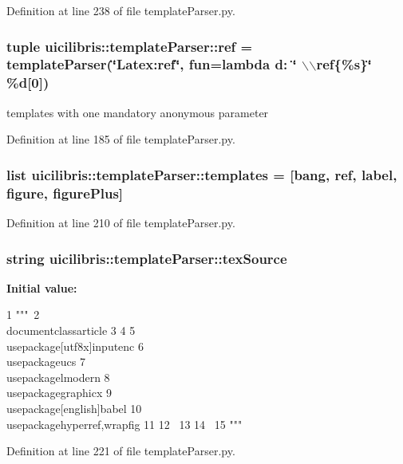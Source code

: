 \-Definition at line 238 of file template\-Parser.\-py.

\hypertarget{namespaceuicilibris_1_1templateParser_ad641a7d51cf16935ac4a7912f8cca790}{
\subsubsection[{ref}]{\setlength{\rightskip}{0pt plus 5cm}tuple {\bf uicilibris\-::template\-Parser\-::ref} = {\bf template\-Parser}(\char`\"{}\-Latex\-:ref\char`\"{}, fun=lambda d\-: \char`\"{} $\backslash$$\backslash$ref\{\%s\}\char`\"{} \%d\mbox{[}0\mbox{]})}}\label{namespaceuicilibris_1_1templateParser_ad641a7d51cf16935ac4a7912f8cca790}


templates with one mandatory anonymous parameter 



\-Definition at line 185 of file template\-Parser.\-py.

\hypertarget{namespaceuicilibris_1_1templateParser_ad7d8a741383be26743e20995ca1fefb5}{
\subsubsection[{templates}]{\setlength{\rightskip}{0pt plus 5cm}list {\bf uicilibris\-::template\-Parser\-::templates} = \mbox{[}{\bf bang}, {\bf ref}, {\bf label}, {\bf figure}, figure\-Plus\mbox{]}}}\label{namespaceuicilibris_1_1templateParser_ad7d8a741383be26743e20995ca1fefb5}


\-Definition at line 210 of file template\-Parser.\-py.

\hypertarget{namespaceuicilibris_1_1templateParser_a1f958fca9ba00cb5d34e5912c7627b0b}{
\subsubsection[{tex\-Source}]{\setlength{\rightskip}{0pt plus 5cm}string {\bf uicilibris\-::template\-Parser\-::tex\-Source}}}\label{namespaceuicilibris_1_1templateParser_a1f958fca9ba00cb5d34e5912c7627b0b}
{\bfseries \-Initial value\-:}
\begin{DoxyCode}
1 """\
2 \\documentclass{article}
3 %
4 
5 \\usepackage[utf8x]{inputenc}
6 \\usepackage{ucs}
7 \\usepackage{lmodern}
8 \\usepackage{graphicx}
9 \\usepackage[english]{babel}
10 \\usepackage{hyperref,wrapfig}
11 
12 \
13 %
14 \
15 """
\end{DoxyCode}


\-Definition at line 221 of file template\-Parser.\-py.

